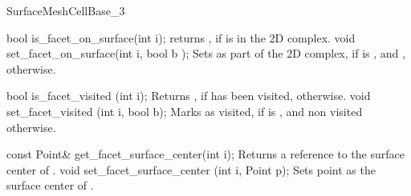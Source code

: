 \begin{ccRefConcept}{SurfaceMeshCellBase_3}
\ccCreation
{}  %



\ccOperations

\ccMethod
{bool is_facet_on_surface(int i);}
{returns , if  is in the 2D complex. }
\ccGlue
\ccMethod
{void set_facet_on_surface(int i, bool b );}
{Sets  as part of the 2D  complex, if  is ,
and , otherwise.}


\ccMethod
{bool is_facet_visited (int i);}
{Returns , if  has been visited,
 otherwise.}
\ccGlue
\ccMethod
{void set_facet_visited (int i, bool b);} 
{Marks  as visited, if  is ,
 and non visited otherwise.}


\ccMethod
{const Point&   get_facet_surface_center(int i);}
{Returns a reference to the surface center of .}
\ccGlue
\ccMethod
{void set_facet_surface_center (int i, Point p);} 
{Sets point  as the surface center of .}


    




\ccHasModels



\ccSeeAlso

 \\
 \\
\\





\end{ccRefConcept}


